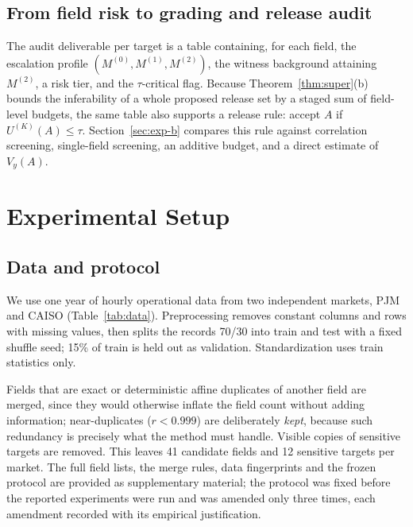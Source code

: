 \documentclass[preprint,12pt]{elsarticle}
\newcommand{\Vy}{V_{y}}
\begin{document}
\subsection{From field risk to grading and release audit}
The audit deliverable per target is a table containing, for each field, the escalation
profile $(M^{(0)},M^{(1)},M^{(2)})$, the witness background attaining $M^{(2)}$, a risk tier,
and the $\tau$-critical flag. Because Theorem~\ref{thm:super}(b) bounds the inferability of a
whole proposed release set by a staged sum of field-level budgets, the same table also
supports a release rule: accept $A$ if $U^{(K)}(A)\le\tau$. Section~\ref{sec:exp-b} compares
this rule against correlation screening, single-field screening, an additive budget, and a
direct estimate of $\Vy(A)$.

\section{Experimental Setup}\label{sec:setup}

\subsection{Data and protocol}
We use one year of hourly operational data from two independent markets, PJM and CAISO
(Table~\ref{tab:data}). Preprocessing removes constant columns and rows with missing values,
then splits the records 70/30 into train and test with a fixed shuffle seed; 15\% of train
is held out as validation. Standardization uses train statistics only.

Fields that are exact or deterministic affine duplicates of another field are merged, since
they would otherwise inflate the field count without adding information; near-duplicates
($r<0.999$) are deliberately \emph{kept}, because such redundancy is precisely what the
method must handle. Visible copies of sensitive targets are removed. This leaves 41
candidate fields and 12 sensitive targets per market. The full field lists, the merge rules,
data fingerprints and the frozen protocol are provided as supplementary material; the
protocol was fixed before the reported experiments were run and was amended only three times,
each amendment recorded with its empirical justification.
\end{document}
